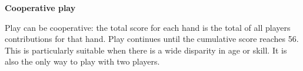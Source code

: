 \documentclass[11pt]{article}
\newcommand\myssection[1]{\begin{center}\bf\small\noindent #1\end{center}}
\begin{document}
\myssection{Cooperative play} Play can be cooperative: the total score
for each hand is the total of all players contributions for that hand.
Play continues until the cumulative score reaches 56.  This is
particularly suitable when there is a wide disparity in age or skill.
It is also the only way to play with two players.



\end{document}
